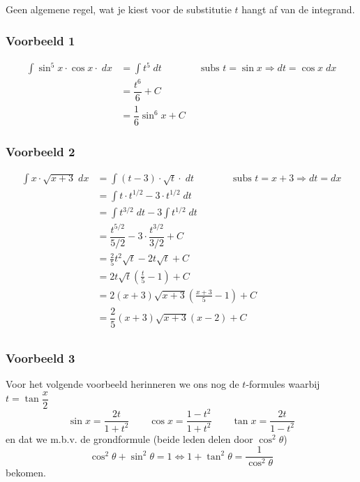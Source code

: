 \documentclass[a4paper,12pt, twoside]{article}
\begin{document}
Geen algemene regel, wat je kiest voor de substitutie $t$ hangt af van de integrand.

\subsubsection*{Voorbeeld 1}
\begin{align*}
  \int \sin^5x \cdot \cos x \cdot \;dx
  &= \int t^5 \;dt \qquad\qquad\mbox{subs }t=\sin x \Rightarrow dt = \cos x \;dx\\
  &= \dfrac{t^6}{6} +C\\
  &= \dfrac{1}{6}\sin^6 x + C
\end{align*}

\subsubsection*{Voorbeeld 2}
\begin{align*}
  \int x \cdot \sqrt{x+3} \;dx
  &= \int (t-3) \cdot \sqrt{t} \cdot \;dt \qquad\qquad\mbox{subs }t=x+3 \Rightarrow dt = dx\\
  &= \int t\cdot t^{1/2} - 3\cdot t^{1/2} \;dt\\
  &= \int t^{3/2} \;dt - 3 \int t^{1/2} \;dt\\
  &= \dfrac{t^{5/2}}{5/2} - 3\cdot \dfrac{t^{3/2}}{3/2} + C\\
  &= \frac{2}{5}t^2\sqrt{t} - 2 t \sqrt{t} + C\\
  &= 2t\sqrt{t}(\frac{t}{5}-1) + C\\
  &= 2(x+3)\sqrt{x+3}\left(\frac{x+3}{5}-1\right) + C\\
  &= \dfrac{2}{5}(x+3)\sqrt{x+3}\left(x-2\right) + C\\
\end{align*}

\subsubsection*{Voorbeeld 3}

Voor het volgende voorbeeld herinneren we ons nog de $t$-formules waarbij $t=\tan\dfrac{x}{2}$
$$\sin x = \dfrac{2t}{1+t^2} \qquad \cos x = \dfrac{1-t^2}{1+t^2} \qquad \tan x = \dfrac{2t}{1-t^2}$$
en dat we m.b.v. de grondformule (beide leden delen door $\cos^2\theta$)
$$\cos^2\theta + \sin^2\theta = 1 \Leftrightarrow 1 + \tan^2\theta = \dfrac{1}{\cos^2\theta}$$
bekomen.
\end{document}
